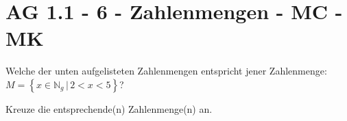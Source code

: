\section{AG 1.1 - 6 - Zahlenmengen - MC - MK}

\begin{beispiel}[AG 1.1]{1} %
				Welche der unten aufgelisteten Zahlenmengen entspricht jener Zahlenmenge: $M=\left\{x\in\mathbb{N}_{g}\,|\,2<x<5\right\}$?
				
				Kreuze die entsprechende(n) Zahlenmenge(n) an.
				
\end{beispiel}